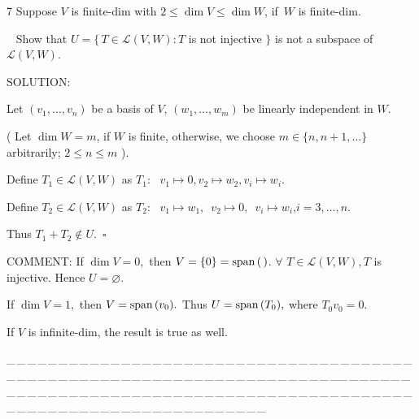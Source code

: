 \documentclass[a4paper, 11pt, UTF8]{article}
\def\Spn{\textup{span}\,}
\def\Lm{\mathcal{L}}
\begin{document}
\begin{large}
{\timesbf\Large 7} {\timessl\Large 
Suppose $V$ is finite-dim with $2\leq\dim V\leq\dim W$, if \,$W$ is finite-dim.}\par\,\,\,
{\timessl\Large Show that $U=\{\,T\in\Lm(V, W):T$ is not injective $\}$ is not a subspace of $\Lm(V, W)$.
}\par
{\timesbf S\footnotesize{OLUTION:}}\par\quad
Let $(v_1,\dots,v_n)$ be a basis of $V$, $(w_1,\dots,w_m)$ be linearly independent in $W$.\par\quad
( Let $\dim W=m$, if $W$ is finite, otherwise, we choose $m\in\{n,n+1,\dots\}$ arbitrarily; $2\leq n\leq m$ ).\par\quad
Define $T_1\in\Lm(V,W)$ as $T_1:\,\,\,\,v_1\mapsto 0,$\qquad$v_2\mapsto w_2,$\qquad$v_i\mapsto w_i$.\par\quad
Define $T_2\in\Lm(V,W)$ as $T_2:\,\,\,\,v_1\mapsto w_1,$ \quad\,$v_2\mapsto 0,$\,\,\,\qquad$v_i\mapsto w_i$,\qquad $i=3,\dots,n.$\par\quad
Thus $T_1+T_2\not\in U.\,\,\,\square$\par
{\timesbf C\small{OMMENT:}} If $\dim V=0,$ then $V=\{0\}=\Spn(\,)$. $\forall\,\,T\in\Lm(V,W), T$ is injective. Hence $U=\varnothing$.\par\qquad\quad If $\dim V=1,$ then $V=\Spn(v_0).$ Thus $U=\Spn(T_0),$ where $T_0 v_0=0.$\par\qquad\quad If $V$ is infinite-dim, the result is true as well.\par
{\tiny \_\,\_\,\_\,\_\,\_\,\_\,\_\,\_\,\_\,\_\,\_\,\_\,\_\,\_\,\_\,\_\,\_\,\_\,\_\,\_\,\_\,\_\,\_\,\_\,\_\,\_\,\_\,\_\,\_\,\_\,\_\,\_\,\_\,\_\,\_\,\_\,\_\,\_\,\_\,\_\,\_\,\_\,\_\,\_\,\_\,\_\,\_\,\_\,\_\,\_\,\_\,\_\,\_\,\_\,\_\,\_\,\_\,\_\,\_\,\_\,\_\,\_\,\_\,\_\,\_\,\_\,\_\,\_\,\_\,\_\,\_\_\,\_\,\_\,\_\,\_\,\_\,\_\,\_\,\_\,\_\,\_\,\_\,\_\,\_\,\_\,\_\,\_\,\_\,\_\,\_\,\_\,\_\,\_\,\_\,\_\,\_\,\_\,\_\,\_\,\_\,\_\,\_\,\_\,\_\,\_\,\_\,\_\,\_\,\_\,\_\,\_\,\_\,\_\,\_\,\_\,\_\,\_\,\_\,\_\,\_\,\_\,\_\,\_\,\_\,\_\,\_\,\_\,\_\,\_\,\_\,\_\,\_\,\_\,\_\,\_\,\_\,\_\,\_\,\_\,\_\,\_}{\tiny\,\par}


\end{large}
\end{document}
